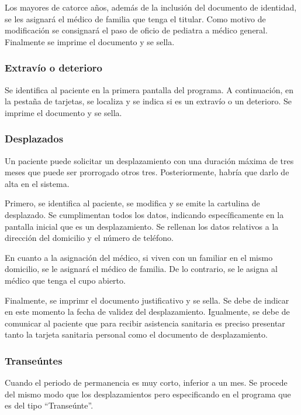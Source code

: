 Los mayores de catorce años, además de la inclusión del documento de identidad, se les asignará el médico de familia que tenga el titular.
Como motivo de modificación se consignará el paso de oficio de pediatra a médico general.
Finalmente se imprime el documento y se sella.

\subsubsection{Extravío o deterioro}

Se identifica al paciente en la primera pantalla del programa.
A continuación, en la pestaña de tarjetas, se localiza y se indica si es un extravío o un deterioro.
Se imprime el documento y se sella.

\subsubsection{Desplazados}

Un paciente puede solicitar un desplazamiento con una duración máxima de tres meses que puede ser prorrogado otros tres.
Posteriormente, habría que darlo de alta en el sistema.

Primero, se identifica al paciente, se modifica y se emite la cartulina de desplazado.
Se cumplimentan todos los datos, indicando específicamente en la pantalla inicial que es un desplazamiento.
Se rellenan los datos relativos a la dirección del domicilio y el número de teléfono.

En cuanto a la asignación del médico, si viven con un familiar en el mismo domicilio, se le asignará el médico de familia.
De lo contrario, se le asigna al médico que tenga el cupo abierto.

Finalmente, se imprimr el documento justificativo y se sella.
Se debe de indicar en este momento la fecha de validez del desplazamiento.
Igualmente, se debe de comunicar al paciente que para recibir asistencia sanitaria es preciso presentar tanto la tarjeta sanitaria personal como el documento de desplazamiento.

\subsubsection{Transeúntes}

Cuando el periodo de permanencia es muy corto, inferior a un mes.
Se procede del mismo modo que los desplazamientos pero especificando en el programa que es del tipo ``Transeúnte''.


